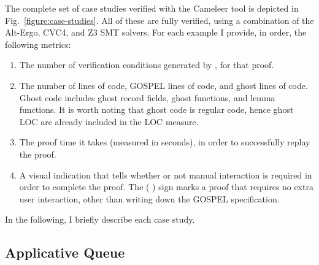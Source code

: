 \documentclass{llncs}
\newcommand{\cameleer}{\textsf{Cameleer}\xspace}
\renewcommand{\check}{
  \raisebox{-.25\height}{\texttt{[image: check.png]}}}
\newcommand{\GOSPEL}{{\textsf{GOSPEL}}\xspace}
\begin{document}
The complete set of case studies verified with the \cameleer tool is depicted in
Fig.~\ref{figure:case-studies}. All of these are fully verified, using a
combination of the Alt-Ergo, CVC4, and Z3 SMT solvers. For each example I
provide, in order, the following metrics:
%
\begin{enumerate}
\item The number of verification conditions generated by \why, for that proof.
\item The number of \ocaml lines of code, \GOSPEL lines of code, and ghost lines
  of code. Ghost code includes ghost record fields, ghost functions, and lemma
  functions. It is worth noting that ghost code is regular \ocaml code, hence
  ghost LOC are already included in the \ocaml LOC measure.
\item The proof time it takes (measured in seconds), in order to successfully
  replay the proof.
\item A visual indication that tells whether or not manual interaction is
  required in order to complete the proof. The (\check) sign marks a proof
  that requires no extra user interaction, other than writing down the \GOSPEL
  specification.
\end{enumerate}
%
In the following, I briefly describe each case study.

\subsection{Applicative Queue}
\label{sec:applicative-queue}
\end{document}
